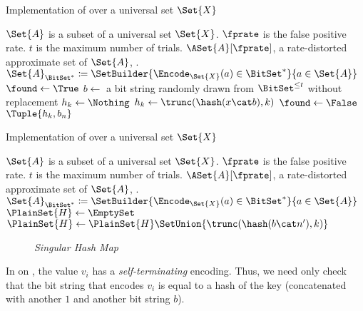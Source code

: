 \documentclass[ ../main.tex]{subfiles}
\begin{document}
\begin{algorithm}
	\caption{Implementation of \protect\MakeSingularHashMap over a universal set $\Set{X}$}
	\label{alg:makeset}
	\DontPrintSemicolon
	\KwIn
	{
		$\Set{A}$ is a subset of a universal set $\Set{X}$.
		$\fprate$ is the false positive rate.
		$t$ is the maximum number of trials.
	}
	\KwOut
	{
		$\ASet{A}[\fprate]$, a rate-distorted approximate set of $\Set{A}$, .
	}
	{
		$\Set{A}_{\BitSet^*} \coloneqq \SetBuilder{\Encode_{\Set{X}}(a) \in \BitSet^*}{a \in \Set{A}}$\;
		{
			$\found \gets \True$\;
			$b \gets $ a bit string randomly drawn from $\BitSet^{\leq t}$ without replacement\;
			$h_k \gets \Nothing$\;
			{
				{
					$h_k \gets \trunc(\hash(x \cat b), k)$\;
				}
				{
					$\found \gets \False$\;
				}
			}
			\If{\found}
			{
				\Return $\Tuple{h_k, b_n}$\;
			}
		}
	}
\end{algorithm}





\begin{algorithm}
	\caption{Implementation of \protect\MakeSingularHashMap over a universal set $\Set{X}$}
	\label{alg:makeset}
	\DontPrintSemicolon
	\KwIn
	{
		$\Set{A}$ is a subset of a universal set $\Set{X}$.
		$\fprate$ is the false positive rate.
		$t$ is the maximum number of trials.
	}
	\KwOut
	{
		$\ASet{A}[\fprate]$, a rate-distorted approximate set of $\Set{A}$, .
	}
	{
		$\Set{A}_{\BitSet^*} \coloneqq \SetBuilder{\Encode_{\Set{X}}(a) \in \BitSet^*}{a \in \Set{A}}$\;
		{
			$\PlainSet{H} \gets \EmptySet$\;
			{
				$\PlainSet{H} \gets \PlainSet{H} \SetUnion \{\trunc(\hash(b \cat n'), k)\}$\;
			}
		}
	}
\end{algorithm}



\begin{figure}
    \centering
    \caption{\emph{Singular Hash Map}}
    \label{fig:shmap}
\end{figure}



In  on , the value $v_i$ has a \emph{self-terminating} encoding. Thus, we need only check that the bit string that encodes $v_i$ is equal to a hash of the key (concatenated with another $1$ and another bit string $b$).
\end{document}
